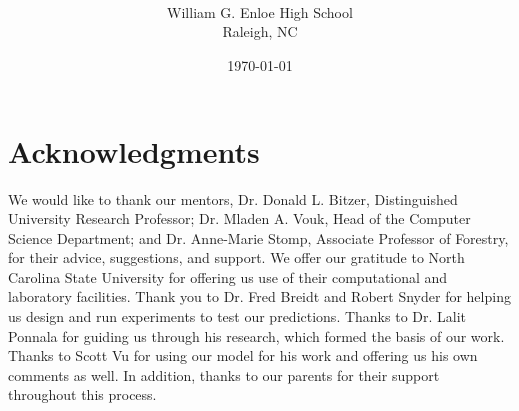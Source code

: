 \documentclass{article}
\author{\sc{\BWFauthors}\\
William G. Enloe High School\\
Raleigh, NC}
\date{{\sc \today}}
\title{\bf{\BWFtitle{\emph}{ }}}
\begin{document}
\maketitle

\newpage
\section*{Acknowledgments}
We would like to thank our mentors, Dr. Donald L. Bitzer,
Distinguished University Research Professor; Dr. Mladen A. 
Vouk, Head of the Computer Science Department; and Dr. Anne-Marie
Stomp, Associate Professor of Forestry, for their advice, suggestions,
and support.  We offer our gratitude to North Carolina State University
for offering us use of their computational and laboratory facilities.  
Thank you to Dr. Fred Breidt and Robert Snyder for helping us design
and run experiments to test our predictions.  Thanks to Dr. Lalit
Ponnala for guiding us through his research, which formed the basis
of our work.  Thanks to Scott Vu for using our model for his work and offering
us his own comments as well.  In addition, thanks to our parents for their
support throughout this process.


\newpage
\begin{onehalfspace}
\tableofcontents
\end{onehalfspace}
\newpage
\end{document}
